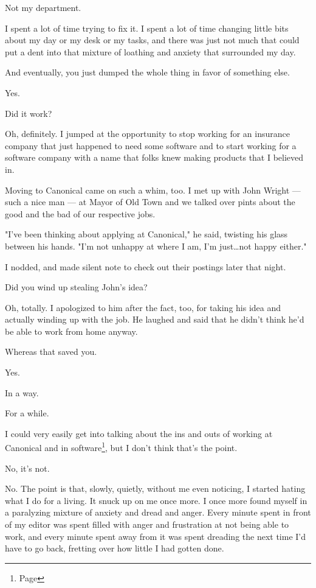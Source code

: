 \begin{paracol}{2}
\begin{leftcolumn}
\begin{ally}
Not my department.
\end{ally}
I spent a lot of time trying to fix it. I spent a lot of time changing little bits about my day or my desk or my tasks, and there was just not much that could put a dent into that mixture of loathing and anxiety that surrounded my day.

\begin{ally}
And eventually, you just dumped the whole thing in favor of something else.
\end{ally}
Yes.

\begin{ally}
Did it work?
\end{ally}
Oh, definitely. I jumped at the opportunity to stop working for an insurance company that just happened to need some software and to start working for a software company with a name that folks knew making products that I believed in.

Moving to Canonical came on such a whim, too. I met up with John Wright --- such a nice man --- at Mayor of Old Town and we talked over pints about the good and the bad of our respective jobs.

"I've been thinking about applying at Canonical," he said, twisting his glass between his hands. "I'm not unhappy at where I am, I'm just\ldots{}not happy either."

I nodded, and made silent note to check out their postings later that night.

\begin{ally}
Did you wind up stealing John's idea?
\end{ally}
Oh, totally. I apologized to him after the fact, too, for taking his idea and actually winding up with the job. He laughed and said that he didn't think he'd be able to work from home anyway.

\begin{ally}
Whereas that saved you.
\end{ally}
Yes.

In a way.

For a while.

\newpage

\noindent I could very easily get into talking about the ins and outs of working at Canonical and in software\footnote{Page \pageref{writing:software}}, but I don't think that's the point.

\begin{ally}
No, it's not.
\end{ally}
No. The point is that, slowly, quietly, without me even noticing, I started hating what I do for a living. It snuck up on me once more. I once more found myself in a paralyzing mixture of anxiety and dread and anger. Every minute spent in front of my editor was spent filled with anger and frustration at not being able to work, and every minute spent away from it was spent dreading the next time I'd have to go back, fretting over how little I had gotten done.


\end{leftcolumn}
\end{paracol}
